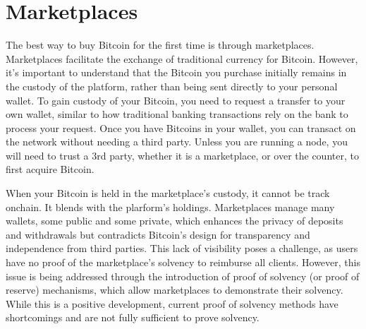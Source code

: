 \section{Marketplaces}
The best way to buy Bitcoin for the first time is through marketplaces. Marketplaces facilitate the exchange of traditional currency for Bitcoin.
However, it's important to understand that the Bitcoin you purchase initially remains in the custody of the platform, rather than being sent directly to your personal wallet.
To gain custody of your Bitcoin, you need to request a transfer to your own wallet, similar to how traditional banking transactions rely on the bank to process your request.
Once you have Bitcoins in your wallet, you can transact on the network without needing a third party.
Unless you are running a node, you will need to trust a 3rd party, whether it is a marketplace, or over the counter, to first acquire Bitcoin.


When your Bitcoin is held in the marketplace's custody, it cannot be track onchain. It blends with the plarform's holdings.
Marketplaces manage many wallets, some public and some private, which enhances the privacy of deposits and withdrawals but contradicts Bitcoin's design for transparency and independence from third parties. 
This lack of visibility poses a challenge, as users have no proof of the marketplace's solvency to reimburse all clients. 
However, this issue is being addressed through the introduction of proof of solvency (or proof of reserve) mechanisms, 
which allow marketplaces to demonstrate their solvency. 
While this is a positive development, current proof of solvency methods have shortcomings and are not fully sufficient to prove solvency.


